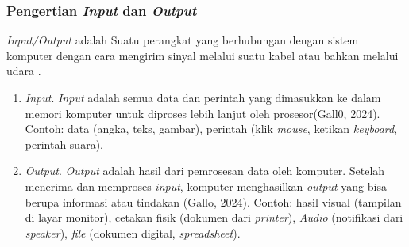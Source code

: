 \documentclass[12pt]{article}
\begin{document}
\subsubsection{Pengertian \textit{Input} dan \textit{Output}}
\textit{Input/Output} adalah Suatu perangkat yang berhubungan dengan sistem komputer dengan cara mengirim sinyal melalui suatu kabel atau bahkan melalui udara .\\
\begin{enumerate}
    \item \textit{Input}.
    \textit{Input} adalah semua data dan perintah yang dimasukkan ke dalam memori komputer untuk diproses lebih lanjut oleh prosesor(Gall0, 2024).
    Contoh: data (angka, teks, gambar), perintah (klik \textit{mouse}, ketikan \textit{keyboard}, perintah suara).\\
    \item \textit{Output}.
    \textit{Output} adalah hasil dari pemrosesan data oleh komputer. Setelah menerima dan memproses \textit{input}, komputer menghasilkan \textit{output} yang bisa berupa informasi atau tindakan (Gallo, 2024).
    Contoh: hasil visual (tampilan di layar monitor), cetakan fisik (dokumen dari \textit{printer}), \textit{Audio} (notifikasi dari \textit{speaker}), \textit{file} (dokumen digital, \textit{spreadsheet}).\\
\end{enumerate}
\end{document}
